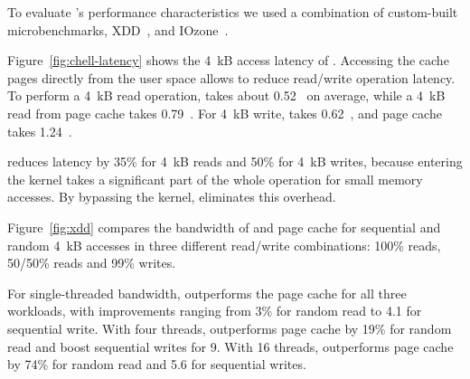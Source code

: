 
To evaluate \CChell{}'s performance characteristics we used a combination of
custom-built microbenchmarks, XDD~\cite{xdd}, and IOzone~\cite{iozone}.

Figure~\ref{fig:chell-latency} shows the 4~kB access latency of \CChell{}.
Accessing the cache pages
directly from the user space allows \CChell{} to reduce read/write operation
latency.  To perform a 4~kB read operation, \CChell{} takes
about 0.52~\us{} on average, while a 4~kB read from page cache takes 0.79~\us{}.
For 4~kB write, \CChell{} takes 0.62~\us{}, and page cache takes 1.24~\us{}.

\CChell{} reduces latency by 35\% for 4~kB reads and 50\% for 4~kB writes, because entering the kernel
takes a significant part
of the whole operation for small memory accesses.  By bypassing the kernel,
\CChell{} eliminates this overhead. 

Figure~\ref{fig:xdd} compares the bandwidth of \CChell{} and page cache for sequential and
random 4~kB accesses in three different read/write combinations: 100\% reads, 
50/50\% reads and 99\% writes.

For single-threaded bandwidth, \CChell{} outperforms the page cache 
for all three workloads, with improvements ranging from 3\% for random read to
4.1\x{} for sequential write.   With four threads,
\CChell{} outperforms page cache by 19\% for random read and boost sequential writes
for 9\x{}.
With 16 threads, \CChell{} outperforms page cache by 74\% for random read and
5.6\x{} for sequential writes.



